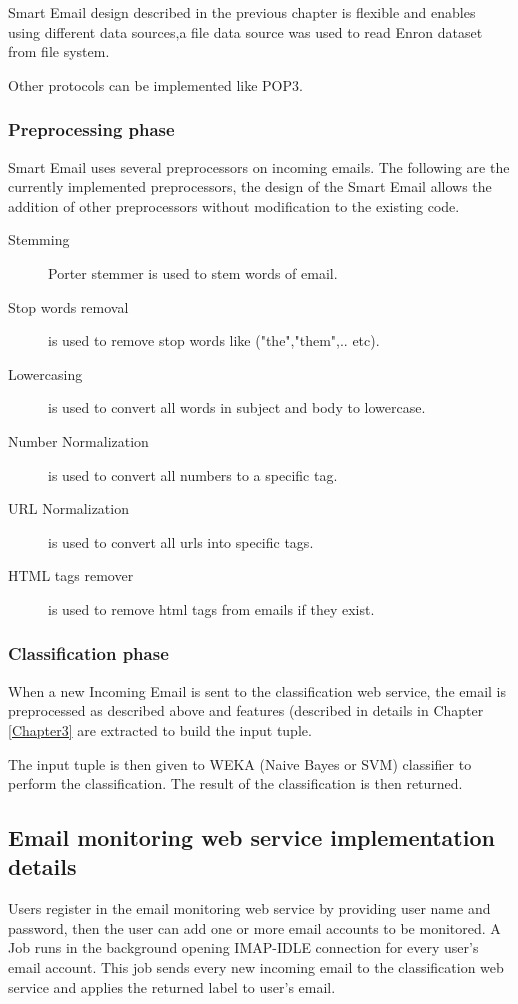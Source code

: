     Smart Email design described in the previous chapter is flexible and enables using different data sources,a file data source was used
    to read Enron \cite{ENRON} dataset from file system.

    Other protocols can be implemented like POP3.

    \subsubsection{Preprocessing phase}
    Smart Email uses several preprocessors on incoming emails. The following are the currently implemented preprocessors,
    the design of the Smart Email allows the addition of other preprocessors without modification to the existing code.
        \begin{description}
        \item[Stemming] Porter stemmer \cite{STEMMER} is used to stem words of email.
        \item[Stop words removal] is used to remove stop words like ("the","them",.. etc).
        \item[Lowercasing] is used to convert all words in subject and body to lowercase.
        \item[Number Normalization] is used to convert all numbers to a specific tag.
        \item[URL Normalization] is used to convert all urls into specific tags.
        \item[HTML tags remover] is used to remove html tags from emails if they exist.
        \end{description}

    \subsubsection{Classification phase}
    When a new Incoming Email is sent to the classification web service,
    the email is preprocessed as described above and features (described in details in Chapter \ref{Chapter3}
    are extracted to build the input tuple.

    The input tuple is then given to WEKA \cite{WEKA} (Naive Bayes or SVM) classifier to 
    perform the classification. The result of the classification is then returned.

\subsection{Email monitoring web service implementation details}
    Users register in the email monitoring web service by providing user name and password,
    then the user can add one or more email accounts to be monitored.
    A Job runs in the background opening IMAP-IDLE connection for every user's email account.
    This job sends every new incoming email to the classification web service and
    applies the returned label to user's email.

